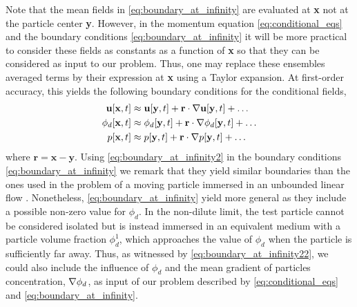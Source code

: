 Note that the mean fields in \ref{eq:boundary_at_infinity} are evaluated at \textbf{x} not at the particle center \textbf{y}.
However, in the momentum equation \eqref{eq:conditional_eqs} and the boundary conditions \ref{eq:boundary_at_infinity} it will be more practical to consider these fields as constants as a function of \textbf{x} so that they can be considered as input to our problem. 
Thus, one may replace these ensembles averaged terms by their expression at \textbf{x} using a Taylor expansion. 
At first-order accuracy, this yields the following boundary conditions for the conditional fields, 
\begin{align}
    \textbf{u}[\textbf{x},t] 
    &\approx \textbf{u}[\textbf{y},t] 
    + \textbf{r}\cdot \grad\textbf{u}[\textbf{y},t] 
    \label{eq:boundary_at_infinity23}
    + \ldots\\
    \phi_d[\textbf{x},t] 
    &\approx \phi_d[\textbf{y},t] 
    \label{eq:boundary_at_infinity22}
    + \textbf{r}\cdot \grad \phi_d[\textbf{y},t]  
    + \ldots\\
    p[\textbf{x},t] 
    &\approx p[\textbf{y},t] 
    + \textbf{r}\cdot  \grad p[\textbf{y},t] 
    + \ldots
    \label{eq:boundary_at_infinity2}
\end{align}
where $\textbf{r} = \textbf{x} - \textbf{y}$. 
Using \ref{eq:boundary_at_infinity2} in the boundary conditions \eqref{eq:boundary_at_infinity} we remark that they yield similar boundaries than the ones used in the problem of a moving particle immersed in an unbounded linear flow \citep{jackson1997locally,zhang1997momentum}. 
Nonetheless,  \ref{eq:boundary_at_infinity} yield more general as they include a possible non-zero value for $\phi_d$. 
In the non-dilute limit, the test particle cannot be considered isolated but is instead immersed in an equivalent medium with a particle volume fraction $\phi_d^1$, which approaches the value of $\phi_d$ when the particle is sufficiently far away. 
Thus, as witnessed by \ref{eq:boundary_at_infinity22}, we could also include the influence of $\phi_d$ and the mean gradient of particles concentration, $\mathbf{\nabla} \phi_d$, as input of our problem described by \eqref{eq:conditional_eqs} and \ref{eq:boundary_at_infinity}.


